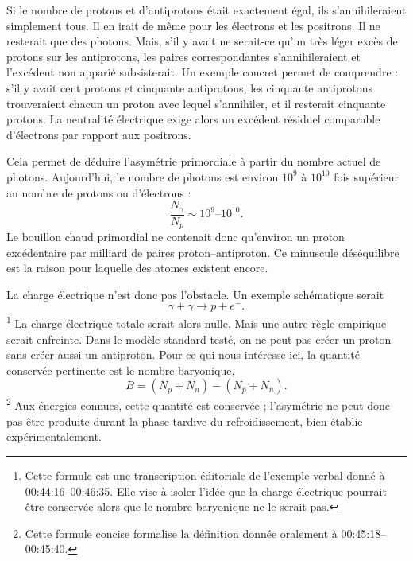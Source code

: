 Si le nombre de protons et d’antiprotons était exactement égal, ils s’annihileraient simplement tous. Il en irait de même pour les électrons et les positrons. Il ne resterait que des photons. Mais, s’il y avait ne serait-ce qu’un très léger excès de protons sur les antiprotons, les paires correspondantes s’annihileraient et l’excédent non apparié subsisterait. Un exemple concret permet de comprendre : s’il y avait cent protons et cinquante antiprotons, les cinquante antiprotons trouveraient chacun un proton avec lequel s’annihiler, et il resterait cinquante protons. La neutralité électrique exige alors un excédent résiduel comparable d’électrons par rapport aux positrons.

Cela permet de déduire l’asymétrie primordiale à partir du nombre actuel de photons. Aujourd’hui, le nombre de photons est environ \(10^9\) à \(10^{10}\) fois supérieur au nombre de protons ou d’électrons :
\[
\frac{N_\gamma}{N_p} \sim 10^9\text{--}10^{10}.
\]
Le bouillon chaud primordial ne contenait donc qu’environ un proton excédentaire par milliard de paires proton--antiproton. Ce minuscule déséquilibre est la raison pour laquelle des atomes existent encore.

\begin{classroomqa}
\end{classroomqa}

La charge électrique n’est donc pas l’obstacle. Un exemple schématique serait
\[
\gamma + \gamma \to p + e^-.
\]\footnote{Cette formule est une transcription éditoriale de l’exemple verbal donné à 00:44:16--00:46:35. Elle vise à isoler l’idée que la charge électrique pourrait être conservée alors que le nombre baryonique ne le serait pas.}
La charge électrique totale serait alors nulle. Mais une autre règle empirique serait enfreinte. Dans le modèle standard testé, on ne peut pas créer un proton sans créer aussi un antiproton. Pour ce qui nous intéresse ici, la quantité conservée pertinente est le nombre baryonique,
\[
B=(N_p+N_n)-(N_{\bar p}+N_{\bar n}).
\]\footnote{Cette formule concise formalise la définition donnée oralement à 00:45:18--00:45:40.}
Aux énergies connues, cette quantité est conservée ; l’asymétrie ne peut donc pas être produite durant la phase tardive du refroidissement, bien établie expérimentalement.

